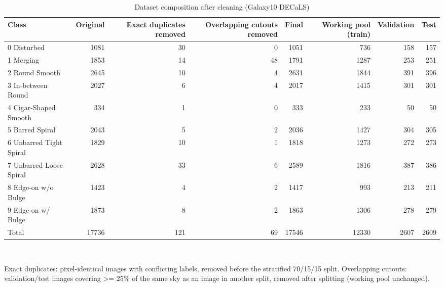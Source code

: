 \begin{table}[t]
\centering
\footnotesize
\caption{Dataset composition after cleaning (Galaxy10 DECaLS)}
\label{tab:t01_dataset}
\begin{tabular}{lrrrrrrr}
\toprule
Class & Original & Exact duplicates removed & Overlapping cutouts removed & Final & Working pool (train) & Validation & Test \\
\midrule
0 Disturbed & 1081 & 30 & 0 & 1051 & 736 & 158 & 157 \\
1 Merging & 1853 & 14 & 48 & 1791 & 1287 & 253 & 251 \\
2 Round Smooth & 2645 & 10 & 4 & 2631 & 1844 & 391 & 396 \\
3 In-between Round & 2027 & 6 & 4 & 2017 & 1415 & 301 & 301 \\
4 Cigar-Shaped Smooth & 334 & 1 & 0 & 333 & 233 & 50 & 50 \\
5 Barred Spiral & 2043 & 5 & 2 & 2036 & 1427 & 304 & 305 \\
6 Unbarred Tight Spiral & 1829 & 10 & 1 & 1818 & 1273 & 272 & 273 \\
7 Unbarred Loose Spiral & 2628 & 33 & 6 & 2589 & 1816 & 387 & 386 \\
8 Edge-on w/o Bulge & 1423 & 4 & 2 & 1417 & 993 & 213 & 211 \\
9 Edge-on w/ Bulge & 1873 & 8 & 2 & 1863 & 1306 & 278 & 279 \\
Total & 17736 & 121 & 69 & 17546 & 12330 & 2607 & 2609 \\
\bottomrule
\end{tabular}
\\[2pt]\parbox{\linewidth}{\scriptsize Exact duplicates: pixel-identical images with conflicting labels, removed before the stratified 70/15/15 split. Overlapping cutouts: validation/test images covering >= 25\% of the same sky as an image in another split, removed after splitting (working pool unchanged).}
\end{table}
